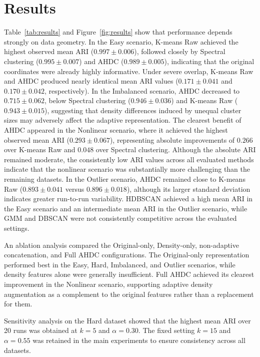 \documentclass[twoside]{article}
\begin{document}
\section{Results}
Table~\ref{tab:results} and Figure~\ref{fig:results} show that performance depends strongly on data geometry. In the Easy scenario, K-means Raw achieved the highest observed mean ARI ($0.997\pm0.006$), followed closely by Spectral clustering ($0.995\pm0.007$) and AHDC ($0.989\pm0.005$), indicating that the original coordinates were already highly informative. Under severe overlap, K-means Raw and AHDC produced nearly identical mean ARI values ($0.171\pm0.041$ and $0.170\pm0.042$, respectively). In the Imbalanced scenario, AHDC decreased to $0.715\pm0.062$, below Spectral clustering ($0.946\pm0.036$) and K-means Raw ($0.943\pm0.015$), suggesting that density differences induced by unequal cluster sizes may adversely affect the adaptive representation. 
The clearest benefit of AHDC appeared in the Nonlinear scenario, where it achieved the highest observed mean ARI ($0.293\pm0.067$), representing absolute improvements of $0.266$ over K-means Raw and $0.048$ over Spectral clustering. Although the absolute ARI remained moderate, the consistently low ARI values across all evaluated methods indicate that the nonlinear scenario was substantially more challenging than the remaining datasets.
In the Outlier scenario, AHDC remained close to K-means Raw ($0.893\pm0.041$ versus $0.896\pm0.018$), although its larger standard deviation indicates greater run-to-run variability.
HDBSCAN achieved a high mean ARI in the Easy scenario and an intermediate mean ARI in the Outlier scenario, while GMM and DBSCAN were not consistently competitive across the evaluated settings.

An ablation analysis compared the Original-only, Density-only,
non-adaptive concatenation, and Full AHDC configurations. The
Original-only representation performed best in the Easy, Hard,
Imbalanced, and Outlier scenarios, while density features alone were
generally insufficient. Full AHDC achieved its clearest improvement in
the Nonlinear scenario, supporting adaptive density augmentation as a
complement to the original features rather than a replacement for them.

Sensitivity analysis on the Hard dataset showed that the highest mean
ARI over 20 runs was obtained at $k=5$ and $\alpha=0.30$. The fixed
setting $k=15$ and $\alpha=0.55$ was retained in the main experiments
to ensure consistency across all datasets.
\end{document}
